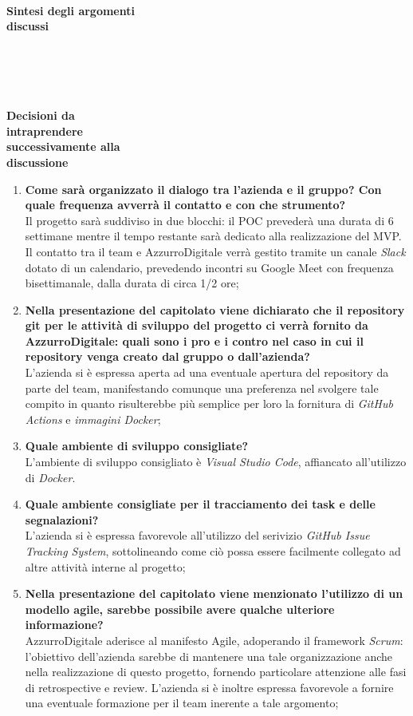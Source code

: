 \documentclass{article}
\begin{document}
\begin{paracol}{2}
\newpage

\switchcolumn
\newpage
{}\\
\textbf{Sintesi degli argomenti\\discussi}
\newpage
~\newpage
~ \\\\\\~

\\
\textbf{Decisioni da\\intraprendere\\successivamente alla\\discussione}
\switchcolumn
\begin{enumerate}
    \item \textbf{Come sarà organizzato il dialogo tra l’azienda e il gruppo? Con quale frequenza avverrà il contatto e con che strumento?} \\Il progetto sarà suddiviso in due blocchi: il POC prevederà una durata di 6 settimane mentre il tempo restante sarà dedicato alla realizzazione del MVP.
    Il contatto tra il team e AzzurroDigitale verrà gestito tramite un canale \textit{Slack} dotato di un calendario, prevedendo incontri su Google Meet con frequenza bisettimanale, dalla durata di circa 1/2 ore;
    \item \textbf{Nella presentazione del capitolato viene dichiarato che il repository git per le attività di sviluppo del progetto ci verrà fornito da AzzurroDigitale: quali sono i pro e i contro nel caso in cui il repository venga creato dal gruppo o dall'azienda?} \\L'azienda si è espressa aperta ad una eventuale apertura del repository da parte del team, manifestando comunque una preferenza nel svolgere tale compito in quanto risulterebbe più semplice per loro la fornitura di \textit{GitHub Actions} e \textit{immagini Docker};
    \item\textbf{Quale ambiente di sviluppo consigliate?}\\ L'ambiente di sviluppo consigliato è \textit{Visual Studio Code}, affiancato all'utilizzo di \textit{Docker}.
    \item \textbf{Quale ambiente consigliate per il tracciamento dei task e delle segnalazioni?} \\L'azienda si è espressa favorevole all'utilizzo del serivizio \textit{GitHub Issue Tracking System}, sottolineando come ciò possa essere facilmente collegato ad altre attività interne al progetto;
    \item\textbf{Nella presentazione del capitolato viene menzionato l'utilizzo di un modello agile, sarebbe possibile avere qualche ulteriore informazione?} \\AzzurroDigitale aderisce al manifesto Agile, adoperando il framework \textit{Scrum}: l'obiettivo dell'azienda sarebbe di mantenere una tale organizzazione anche nella realizzazione di questo progetto, fornendo particolare attenzione alle fasi di retrospective e review. L'azienda si è inoltre espressa favorevole a fornire una eventuale formazione per il team inerente a tale argomento;

\end{enumerate}
\end{paracol}
\end{document}
